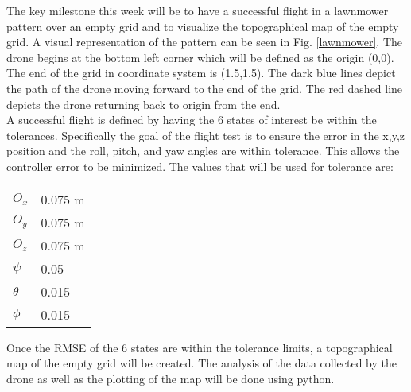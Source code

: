 The key milestone this week will be to have a successful flight in a lawnmower pattern over an empty grid and to visualize the topographical map of the empty grid. A visual representation of the pattern can be seen in Fig. \ref{lawnmower}.  The drone begins at the bottom left corner which will be defined as the origin (0,0). The end of the grid in coordinate system is (1.5,1.5). The dark blue lines depict the path of the drone moving forward to the end of the grid. The red dashed line depicts the drone returning back to origin from the end.\\
\indent A successful flight is defined by having the 6 states of interest be within the tolerances. Specifically the goal of the flight test is to ensure the error in the x,y,z position and the roll, pitch, and yaw angles are within tolerance. This allows the controller error to be minimized. The values that will be used for tolerance are:
{\renewcommand\arraystretch{1.0}
\noindent\begin{longtable*}{@{}l @{\quad \le \quad} l@{}}
$O_x$ & 0.075 m\\
$O_y$ & 0.075 m\\
$O_z$ & 0.075 m\\
$\psi$ & 0.05 \\
$\theta$ & 0.015\\
$\phi$ & 0.015\\
\end{longtable*}}
Once the RMSE of the 6 states are within the tolerance limits, a topographical map of the empty grid will be created. The analysis of the data collected by the drone as well as the plotting of the map will be done using python.

